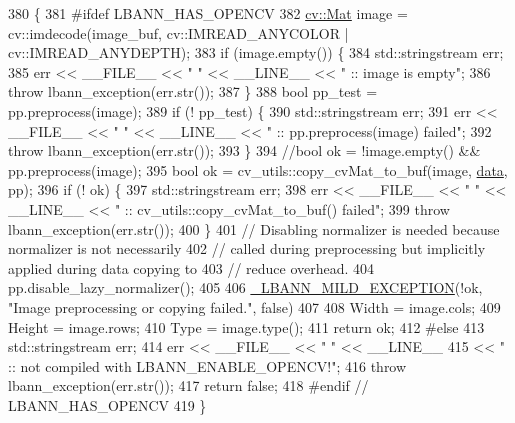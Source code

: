 \begin{DoxyCode}
380                                                                                                    \{
381 \textcolor{preprocessor}{#ifdef LBANN\_HAS\_OPENCV}
382   \hyperlink{base_8hpp_a68f11fdc31b62516cb310831bbe54d73}{cv::Mat} image = cv::imdecode(image\_buf, cv::IMREAD\_ANYCOLOR | cv::IMREAD\_ANYDEPTH);
383   \textcolor{keywordflow}{if} (image.empty()) \{
384     std::stringstream err;
385     err << \_\_FILE\_\_ << \textcolor{stringliteral}{" "} << \_\_LINE\_\_ << \textcolor{stringliteral}{" :: image is empty"};
386     \textcolor{keywordflow}{throw} lbann\_exception(err.str());
387   \}
388   \textcolor{keywordtype}{bool} pp\_test = pp.preprocess(image);
389   \textcolor{keywordflow}{if} (! pp\_test) \{
390     std::stringstream err;
391     err << \_\_FILE\_\_ << \textcolor{stringliteral}{" "} << \_\_LINE\_\_ << \textcolor{stringliteral}{" :: pp.preprocess(image) failed"};
392     \textcolor{keywordflow}{throw} lbann\_exception(err.str());
393   \}
394   \textcolor{comment}{//bool ok = !image.empty() && pp.preprocess(image);}
395   \textcolor{keywordtype}{bool} ok = cv\_utils::copy\_cvMat\_to\_buf(image, \hyperlink{namespacelbann_1_1cnpy__utils_a9ac86d96ccb1f8b4b2ea16441738781f}{data}, pp);
396   \textcolor{keywordflow}{if} (! ok) \{
397     std::stringstream err;
398     err << \_\_FILE\_\_ << \textcolor{stringliteral}{" "} << \_\_LINE\_\_ << \textcolor{stringliteral}{" :: cv\_utils::copy\_cvMat\_to\_buf() failed"};
399     \textcolor{keywordflow}{throw} lbann\_exception(err.str());
400   \}
401   \textcolor{comment}{// Disabling normalizer is needed because normalizer is not necessarily}
402   \textcolor{comment}{// called during preprocessing but implicitly applied during data copying to}
403   \textcolor{comment}{// reduce overhead.}
404   pp.disable\_lazy\_normalizer();
405 
406   \hyperlink{mild__exception_8hpp_a7b8339c566152ab29ce66b63e90c67f9}{\_LBANN\_MILD\_EXCEPTION}(!ok, \textcolor{stringliteral}{"Image preprocessing or copying failed."}, \textcolor{keyword}{false})
407 
408   Width  = image.cols;
409   Height = image.rows;
410   Type   = image.type();
411   return ok;
412 \textcolor{preprocessor}{#else}
413   std::stringstream err;
414   err << \_\_FILE\_\_ << \textcolor{stringliteral}{" "} << \_\_LINE\_\_
415       << \textcolor{stringliteral}{" :: not compiled with LBANN\_ENABLE\_OPENCV!"};
416   \textcolor{keywordflow}{throw} lbann\_exception(err.str());
417   \textcolor{keywordflow}{return} \textcolor{keyword}{false};
418 \textcolor{preprocessor}{#endif // LBANN\_HAS\_OPENCV}
419 \}
\end{DoxyCode}
\mbox{\label{classlbann_1_1image__utils_a75895e02feffc8b32c6c7d168f856778}} 
